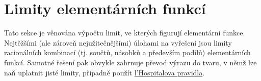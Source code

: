 \section{Limity elementárních funkcí}
\label{sec:limity-elementarnich-funkci}

Tato sekce je věnována výpočtu limit, ve kterých figurují elementární funkce.
Nejtěžšími (ale zároveň nejužitečnějšími) úlohami na vyřešení jsou limity
racionálních kombinací (tj. součtů, násobků a především podílů) elementárních
funkcí. Samotné řešení pak obvykle zahrnuje převod výrazu do tvaru, v němž lze
naň uplatnit jisté  limity, případně použít
\hyperref[thm:lhospital]{l'Hospitalova pravidla}.

